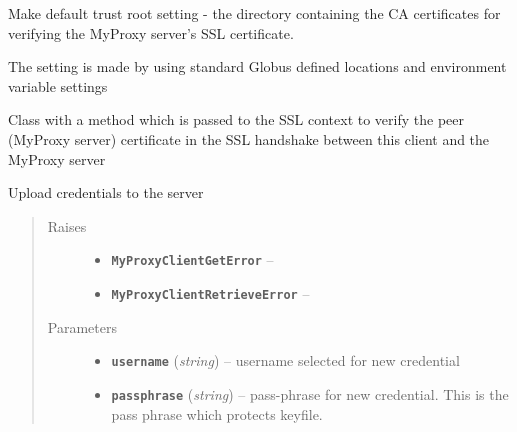 \documentclass[letterpaper,10pt,english]{sphinxmanual}
\begin{document}
\begin{fulllineitems}
\begin{fulllineitems}
\label{client:myproxy.client.MyProxyClient.setDefaultCACertDir}
Make default trust root setting - the directory containing the CA 
certificates for verifying the MyProxy server's SSL certificate.

The setting is made by using standard Globus defined locations and
environment variable settings

\end{fulllineitems}


\begin{fulllineitems}
\label{client:myproxy.client.MyProxyClient.ssl_verification}
Class with a method which is passed to the SSL context to verify the peer (MyProxy server) certificate in the SSL handshake between this client and the MyProxy server

\end{fulllineitems}


\begin{fulllineitems}
\label{client:myproxy.client.MyProxyClient.store}
Upload credentials to the server
\begin{quote}\begin{description}
\item[{Raises}] \leavevmode\begin{itemize}
\item {} 
\textbf{\texttt{MyProxyClientGetError}} -- 

\item {} 
\textbf{\texttt{MyProxyClientRetrieveError}} -- 

\end{itemize}

\item[{Parameters}] \leavevmode\begin{itemize}
\item {} 
\textbf{\texttt{username}} (\emph{string}) -- username selected for new credential

\item {} 
\textbf{\texttt{passphrase}} (\emph{string}) -- pass-phrase for new credential.  This is the pass phrase which protects keyfile.


\end{itemize}
\end{description}
\end{quote}
\end{fulllineitems}
\end{fulllineitems}
\end{document}
